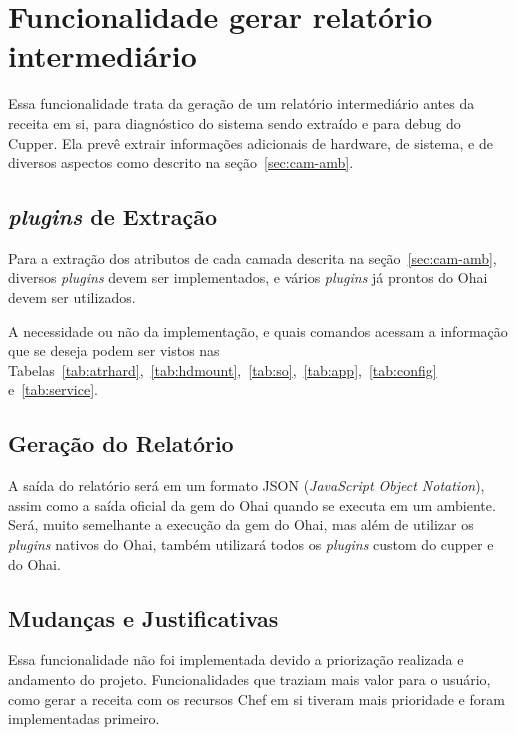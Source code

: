 \section{Funcionalidade gerar relatório intermediário}
\label{sec:rel}

Essa funcionalidade trata da geração de um relatório intermediário antes da 
receita em si, para diagnóstico do sistema sendo extraído e para debug do 
Cupper. Ela prevê extrair informações adicionais de hardware, de sistema, e de
diversos aspectos como descrito na seção~\ref{sec:cam-amb}.

\subsection{\textit{plugins} de Extração}
Para a extração dos atributos de cada camada descrita na seção~\ref{sec:cam-amb},
diversos \textit{plugins} devem ser implementados, e vários \textit{plugins} já prontos do Ohai
devem ser utilizados.

A necessidade ou não da implementação, e quais comandos acessam a informação 
que se deseja podem ser vistos nas Tabelas~\ref{tab:atrhard},~\ref{tab:hdmount},~\ref{tab:so},~\ref{tab:app},~\ref{tab:config} e~\ref{tab:service}.

\subsection{Geração do Relatório}
A saída do relatório será em um formato JSON (\textit{JavaScript Object Notation}),
assim como a saída oficial da gem do Ohai quando se executa em um ambiente. Será,
muito semelhante a execução da gem do Ohai, mas além de utilizar os \textit{plugins} nativos
do Ohai, também utilizará todos os \textit{plugins} custom do cupper e do Ohai.

\subsection{Mudanças e Justificativas}
Essa funcionalidade não foi implementada devido a priorização realizada e andamento
do projeto. Funcionalidades que traziam mais valor para o usuário, como 
gerar a receita com os recursos Chef em si tiveram mais prioridade e foram implementadas
primeiro.
